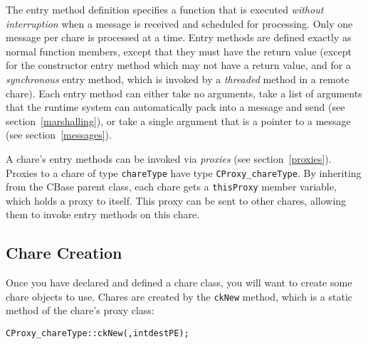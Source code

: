 The entry method definition specifies a function that is executed {\em without
interruption} when a message is received and scheduled for processing. Only one
message per chare is processed at a time.  Entry methods are defined exactly as
normal \CC{} function members, except that they must have the return value
 (except for the constructor entry method which may not have a return
value, and for a {\em synchronous} entry method, which is invoked by a {\em
threaded} method in a remote chare). Each entry method can either take no
arguments, take a list of arguments that the runtime system can automatically
pack into a message and send (see section~\ref{marshalling}), or take a single
argument that is a pointer to a \charmpp message (see section~\ref{messages}).

A chare's entry methods can be invoked via {\it proxies} (see
section~\ref{proxies}). Proxies to a chare of type {\tt chareType} have type
{\tt CProxy\_chareType}. By inheriting from the CBase parent class, each chare
gets a {\tt thisProxy} member variable, which holds a proxy to itself. This
proxy can be sent to other chares, allowing them to invoke entry methods on this
chare.


\subsection{Chare Creation}

\label{chare creation}

Once you have declared and defined a chare class, you will want to create some
chare objects to use. Chares are created by the {\tt ckNew} method, which is a
static method of the chare's proxy class:

\begin{alltt}
   CProxy_chareType::ckNew(, int destPE);
\end{alltt}

